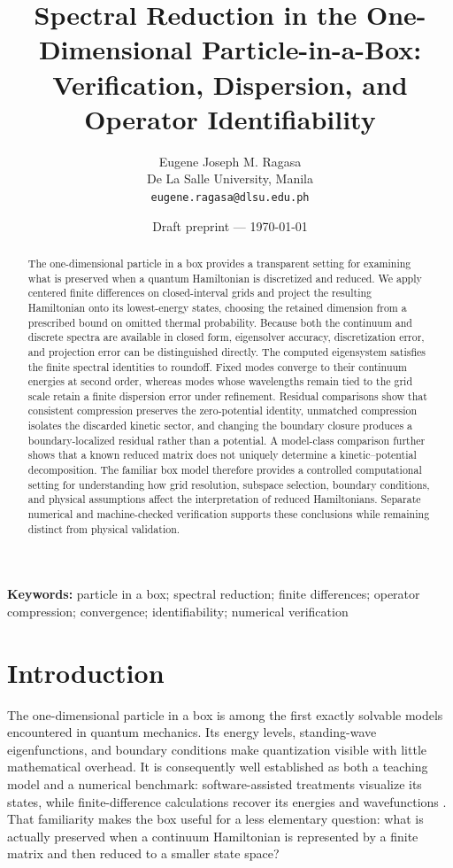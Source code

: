 \documentclass[11pt]{article}
\title{Spectral Reduction in the One-Dimensional Particle-in-a-Box:\\
Verification, Dispersion, and Operator Identifiability}
\author{Eugene Joseph M. Ragasa\\
De La Salle University, Manila\\
\texttt{eugene.ragasa@dlsu.edu.ph}}
\date{Draft preprint --- \today}
\begin{document}
\maketitle

\begin{abstract}
The one-dimensional particle in a box provides a transparent setting for examining
what is preserved when a quantum Hamiltonian is discretized and reduced. We apply
centered finite differences on closed-interval grids and project the resulting
Hamiltonian onto its lowest-energy states, choosing the retained dimension from a
prescribed bound on omitted thermal probability. Because both the continuum and
discrete spectra are available in closed form, eigensolver accuracy, discretization
error, and projection error can be distinguished directly. The computed eigensystem
satisfies the finite spectral identities to roundoff. Fixed modes converge to their
continuum energies at second order, whereas modes whose wavelengths remain tied to the
grid scale retain a finite dispersion error under refinement. Residual comparisons
show that consistent compression preserves the zero-potential identity, unmatched
compression isolates the discarded kinetic sector, and changing the boundary closure
produces a boundary-localized residual rather than a potential. A model-class
comparison further shows that a known reduced matrix does not uniquely determine a
kinetic--potential decomposition. The familiar box model therefore provides a
controlled computational setting for understanding how grid resolution, subspace
selection, boundary conditions, and physical assumptions affect the interpretation
of reduced Hamiltonians. Separate numerical and machine-checked verification supports
these conclusions while remaining distinct from physical validation.
\end{abstract}

\noindent\textbf{Keywords:} particle in a box; spectral reduction; finite differences;
operator compression; convergence; identifiability; numerical verification

\section{Introduction}

The one-dimensional particle in a box is among the first exactly solvable models
encountered in quantum mechanics. Its energy levels, standing-wave eigenfunctions,
and boundary conditions make quantization visible with little mathematical overhead.
It is consequently well established as both a teaching model and a numerical
benchmark: software-assisted treatments visualize its states, while finite-difference
calculations recover its energies and wavefunctions
\cite{magalhaesVasconcelos2006,halpernGeGlendening2022}. That familiarity makes the
box useful for a less elementary question: what is actually preserved when a
continuum Hamiltonian is represented by a finite matrix and then reduced to a smaller
state space?
\end{document}
